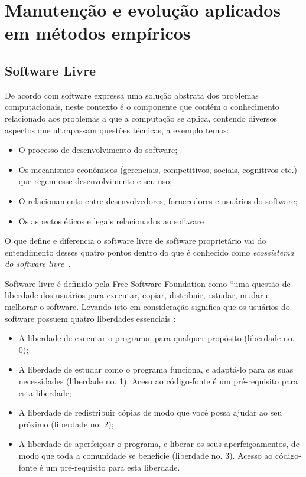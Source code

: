 \section{Manutenção e evolução aplicados em métodos empíricos}

\subsection{Software Livre}
\label{soft-livre}

De acordo com \cite{meirelles2013} software expressa uma solução abstrata dos problemas computacionais, neste contexto é o componente que contém o conhecimento relacionado aos problemas a que a computação se aplica, contendo diversos aspectos que ultrapassam questões técnicas, a exemplo temos:
\begin{itemize}
\item O processo de desenvolvimento do software;
\item Os mecanismos econômicos (gerenciais, competitivos, sociais, cognitivos etc.) que regem esse desenvolvimento e seu uso;
\item O relacionamento entre desenvolvedores, fornecedores e usuários do software;
\item Os aspectos éticos e legais relacionados ao software
\end{itemize}

O que define e diferencia o software livre de software proprietário vai do entendimento desses quatro pontos dentro do que é conhecido como \textit{ecossistema do software livre}~\cite{meirelles2013}.

Software livre é definido pela Free Software Foundation como “uma questão de liberdade dos usuários para executar, copiar, distribuir, estudar, mudar e melhorar o software. Levando isto em consideração significa que os usuários do software possuem quatro liberdades essenciais \cite{stallman2002free}:

\begin{itemize}
\item A liberdade de executar o programa, para qualquer propósito (liberdade no. 0);
\item A liberdade de estudar como o programa funciona, e adaptá-lo para as suas necessidades (liberdade no. 1). Aceso ao código-fonte é um pré-requisito para esta liberdade;
\item A liberdade de redistribuir cópias de modo que você possa ajudar ao seu próximo (liberdade no. 2);
\item A liberdade de aperfeiçoar o programa, e liberar os seus aperfeiçoamentos, de modo que toda a comunidade se beneficie (liberdade no. 3). Acesso ao código-fonte é um pré-requisito para esta liberdade.
\end{itemize}


